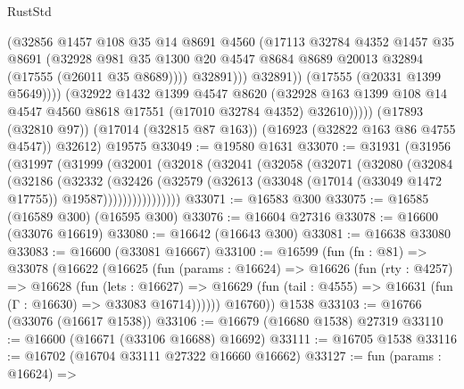 \begin{lexlean}{RustStd}
\begin{coremodule}
{\begin{coremodule}
{{{{{{{{{{{{{{{{{{{{{{{{{{{{{{{{{{{{{{{{{{{{{{{{{{{{{{{                        (@32856
                          @1457
                          @108
                          @35
                          @14
                          @8691
                          @4560
                          (@17113
                            @32784
                            @4352
                            @1457
                            @35
                            @8691
                            (@32928
                              @981
                              @35
                              @1300
                              @20
                              @4547
                              @8684
                              @8689
                              @20013
                              @32894
                              (@17555 (@26011 @35 @8689))))
                          @32891)))
                    @32891))
                (@17555 (@20331 @1399 @5649))))
            (@32922
              @1432
              @1399
              @4547
              @8620
              (@32928 @163 @1399 @108 @14 @4547 @4560 @8618 @17551 (@17010 @32784 @4352) @32610)))))
      (@17893 (@32810 @97))
      (@17014 (@32815 @87 @163))
      (@16923 (@32822 @163 @86 @4755 @4547))
      @32612)
    @19575
@33049 := @19580 @1631
@33070 := @31931
    (@31956
      (@31997
        (@31999
          (@32001
            (@32018
              (@32041
                (@32058
                  (@32071
                    (@32080
                      (@32084
                        (@32186
                          (@32332
                            (@32426
                              (@32579
                                (@32613
                                  (@33048 (@17014 (@33049 @1472 @17755)) @19587))))))))))))))))
@33071 := @16583 @300
@33075 := @16585 (@16589 @300) (@16595 @300)
@33076 := @16604 @27316
@33078 := @16600 (@33076 @16619)
@33080 := @16642 (@16643 @300)
@33081 := @16638 @33080
@33083 := @16600 (@33081 @16667)
@33100 := @16599
    (fun (fn : @81) =>
    @33078
      (@16622
        (@16625
          (fun (params : @16624) =>
          @16626
            (fun (rty : @4257) =>
            @16628
              (fun (lets : @16627) =>
              @16629 (fun (tail : @4555) => @16631 (fun (Γ : @16630) => @33083 @16714))))))
        @16760))
    @1538
@33103 := @16766 (@33076 (@16617 @1538))
@33106 := @16679 (@16680 @1538) @27319
@33110 := @16600 (@16671 (@33106 @16688) @16692)
@33111 := @16705 @1538
@33116 := @16702 (@16704 @33111 @27322 @16660 @16662)
@33127 := fun (params : @16624) =>
}}}}}}}}}}}}}}}}}}}}}}}}}}}}}}}}}}}}}}}}}}}}}}}}}}}}}}}
\end{coremodule}}
\end{coremodule}
\end{lexlean}
